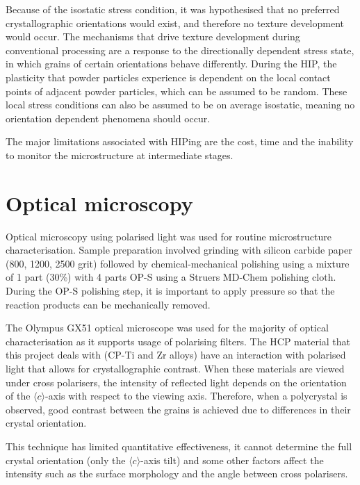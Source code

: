 Because of the isostatic stress condition, it was hypothesised that no preferred crystallographic orientations would exist, and therefore no texture development would occur.
The mechanisms that drive texture development during conventional processing are a response to the directionally dependent stress state, in which grains of certain orientations behave differently.
During the HIP, the plasticity that powder particles experience is dependent on the local contact points of adjacent powder particles, which can be assumed to be random.
These local stress conditions can also be assumed to be on average isostatic, meaning no orientation dependent phenomena should occur.

The major limitations associated with HIPing are the cost, time and the inability to monitor the microstructure at intermediate stages.


\section{Optical microscopy}
Optical microscopy using polarised light was used for routine microstructure characterisation.
Sample preparation involved grinding with silicon carbide paper (800, 1200, 2500 grit) followed by chemical-mechanical polishing using a mixture of 1 part (30\%) with 4 parts OP-S using a Struers MD-Chem polishing cloth.
During the OP-S polishing step, it is important to apply pressure so that the reaction products can be mechanically removed.

The Olympus GX51 optical microscope was used for the majority of optical characterisation as it supports usage of polarising filters.
The HCP material that this project deals with (CP-Ti and Zr alloys) have an interaction with polarised light that allows for crystallographic contrast.
When these materials are viewed under cross polarisers, the intensity of reflected light depends on the orientation of the $\langle c \rangle$-axis with respect to the viewing axis.
Therefore, when a polycrystal is observed, good contrast between the grains is achieved due to differences in their crystal orientation.

This technique has limited quantitative effectiveness, it cannot determine the full crystal orientation (only the $\langle c \rangle$-axis tilt) and some other factors affect the intensity such as the surface morphology and the angle between cross polarisers.

